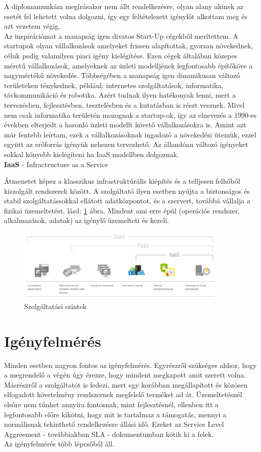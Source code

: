 \documentclass[12pt,oneside,justify,table]{book}
\begin{document}
A diplomamunkám megírásakor nem állt rendelkezésre, olyan alany akinek az esetét fel lehetett volna dolgozni, így egy feltételezett igénylőt alkottam meg és azt vezetem végig. \\

Az inspirációmat a manapság igen divatos Start-Up cégekből merítettem. A startupok olyan vállalkozások amelyeket frissen alapítottak, gyorsan növekednek, céluk pedig valamilyen piaci igény kielégítése. Ezen cégek általában közepes méretű vállalkozások, amelyeknek az üzleti modelljének legfontosabb építőköve a nagymértékű növekedés. Többségében a manapság igen dinamikusan változó területeken ténykednek, például: internetes szolgáltatások, informatika, távkommunikáció és robotika. Azért tudnak ilyen hatékonyak lenni, mert a tervezésben, fejlesztésben, tesztelésben és a kutatásban is részt vesznek. Mivel nem csak informatika területén mozognak a startup-ok, így az elnevezés a 1990-es években elterjedt a hasonló üzleti modellt követő vállalkozásokra is.
Amint azt már fentebb leírtam, ezek a vállalkozásoknak ingadozó a növekedési ütemük, ezzel együtt az erőforrás igényük nehezen tervezhető.  Az állandóan változó igényeket sokkal könyebb kielégíteni ha IaaS modellben dolgoznak.\\

\noindent \textbf{IaaS} - Infractructure as a Service \cite{IaaS}

Átmenetet képez a klasszikus infrastruktúrális kiépítés és a telljesen felhőből kiszolgált rendszerek között. A szolgáltató ilyen esetben nyújta a biztonságos és stabil szolgáltatássokkal ellátott adatközpontot, és a szervert, továbbá vállalja a fizikai üzemeltetést, lásd: \ref{fig:aaS} ábra. Mindent ami erre épül (operációs rendszer, alkalmazások, adatok) az igénylő üzemelteti és kezeli. 
\begin{figure}[ht]
\centering
\includegraphics[width=0.9\textwidth]{aaS.jpg}
\caption{Szolgáltatási szintek}
\label{fig:aaS}
\end{figure}

\section{Igényfelmérés}
Minden esetben nagyon fontos az igényfelmérés. Egyrészről szükséges ahhoz, hogy a megrendelő a végén úgy érezze, hogy mindent megkapott amit szerett volna. Másrészről a szolgáltatót is fedezi, mert egy korábban megállapított és közösen elfogadott követelmény rendszernek megfelelő terméket ad át. Üzemeltetésnél elsőre nem tűnhet annyira fontosnak, mint fejlesztésnél, ellenben itt a legfontosabb előre kikötni, hogy mit is tartalmaz a támogatás, mennyi a normálisnak tekinthető rendelkezésre állási idő. Ezeket az Service Level Aggreement - továbbiakban SLA - dokumentumban kötik ki a felek. \\
Az igényfelmérés több lépcsőből áll. 
\end{document}
